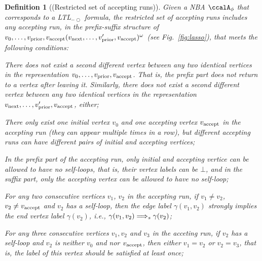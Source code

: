 \documentclass[Afour,sageh,times]{sagej}
\newtheorem{defn}[thm]{Definition}
\newcounter{mycounter}
\newenvironment{noindlist}
 {\begin{list}{\alph{mycounter})~~}{\usecounter{mycounter} \labelsep=0em \labelwidth=0em \leftmargin=0em \itemindent=0em}}
 {\end{list}}
\newcommand{\ltl}{ {\it LTL}$_{-\bigcirc}$ }
\newcommand{\autop}{\ccalA_{\phi}}
\newcommand{\vertex}[1]{v_{\textup{#1}}}
\newcommand{\simplies}{\DOTSB\Longrightarrow}
\begin{document}
\begin{defn}[(Restricted set of accepting runs)]\label{defn:run}
  Given a NBA $\autop$ that corresponds to a \ltl formula, the  restricted set of accepting runs includes any accepting run, in the prefix-suffix structure of $v_0, \ldots, \vertex{prior}, \vertex{accept} (\vertex{next}, \ldots, \vertex{prior}', \vertex{accept})^\omega$ (see Fig.~\ref{fig:lasso}), that meets the following conditions:
  \begin{noindlist}
    \setlength\itemsep{0em}
  \item \label{cond:a} There does not exist a  second  different vertex between any two identical vertices  in the representation  $v_0, \ldots, \vertex{prior}, \vertex{accept}$. That is, the prefix part does not return to a vertex after leaving it. Similarly, there does not exist a second different vertex  between any two identical vertices in the representation $\vertex{next}, \ldots, \vertex{prior}', \vertex{accept}$, either;
  \item \label{cond:b} There only exist one initial vertex $v_0$ and one  accepting vertex $\vertex{accept}$ in the accepting run (they can appear multiple times in a row), but different accepting runs can have different pairs of initial and accepting vertices;
 \item \label{cond:c} In the prefix part of the accepting run, only initial and accepting vertice can be allowed to have no self-loops, that is, their vertex labels  can be $\bot$, and in the suffix part,  only the accepting vertex can be allowed to have no self-loop;
 \item  \label{cond:d} For any two consecutive vertices $v_1$, $v_2$ in the accepting run, if $v_1 \neq v_2$, $v_2\neq \vertex{accept}$ and $v_2$ has a self-loop, then the edge label $\gamma(v_1, v_2)$ strongly implies    the end vertex label $\gamma(v_2)$, i.e., $\gamma(v_1, v_2) \simplies_s \gamma(v_2)$;
 \item \label{cond:e} For any three consecutive vertices $v_1, v_2$ and $v_3$ in the acceting run, if $v_2$ has a self-loop and $v_2$ is neither $v_0$ and nor $\vertex{accept}$, then either $v_1 = v_2$ or $v_2 = v_3$, that is, the label of this vertex should be satisfied at least once;

\end{noindlist}
\end{defn}
\end{document}
